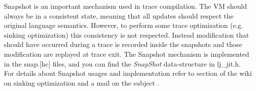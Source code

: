 Snapshot is an important mechanism used in trace compilation. The VM should
always be in a consistent state, meaning that all updates should respect the
original language semantics. However, to perform some trace optimization
(e.g. sinking optimization) this consistency is not respected. Instead
modification that should have occurred during a trace is recorded inside the
snapshots and those modification are replayed at trace exit. The Snapshot
mechanism is implemented in the snap.[hc] files, and you can find the
\emph{SnapShot} data-structure in lj\_jit.h. For details about
Snapshot usages and implementation refer to section of the wiki on sinking
optimization \cite{luajit-sink} and a mail on the subject \cite{luajit-mail-1}.
